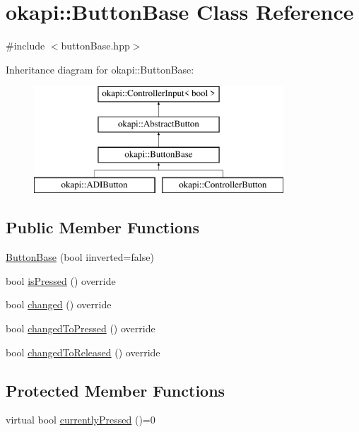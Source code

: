 \hypertarget{classokapi_1_1ButtonBase}{}\section{okapi\+::Button\+Base Class Reference}
\label{classokapi_1_1ButtonBase}


{\ttfamily \#include $<$button\+Base.\+hpp$>$}

Inheritance diagram for okapi\+::Button\+Base\+:\begin{figure}[H]
\begin{center}
\leavevmode
\includegraphics[height=4.000000cm]{classokapi_1_1ButtonBase}
\end{center}
\end{figure}
\subsection*{Public Member Functions}
\begin{DoxyCompactItemize}
\item 
\mbox{\hyperlink{classokapi_1_1ButtonBase_a6327e273244bac5ca425f23999807849}{Button\+Base}} (bool iinverted=false)
\item 
bool \mbox{\hyperlink{classokapi_1_1ButtonBase_a82f27002395801e0d1a6c3213b6454f4}{is\+Pressed}} () override
\item 
bool \mbox{\hyperlink{classokapi_1_1ButtonBase_a0d70e238573b2454fec934a6a7b2338d}{changed}} () override
\item 
bool \mbox{\hyperlink{classokapi_1_1ButtonBase_ac97e3d96db3d83f1638ad071e2dff856}{changed\+To\+Pressed}} () override
\item 
bool \mbox{\hyperlink{classokapi_1_1ButtonBase_a7916b659f61e8ef2b23aec879a65fbac}{changed\+To\+Released}} () override
\end{DoxyCompactItemize}
\subsection*{Protected Member Functions}
\begin{DoxyCompactItemize}
\item 
virtual bool \mbox{\hyperlink{classokapi_1_1ButtonBase_a748b6f2b5ebce9fa9f6bbc9d170d3d7a}{currently\+Pressed}} ()=0
\end{DoxyCompactItemize}

